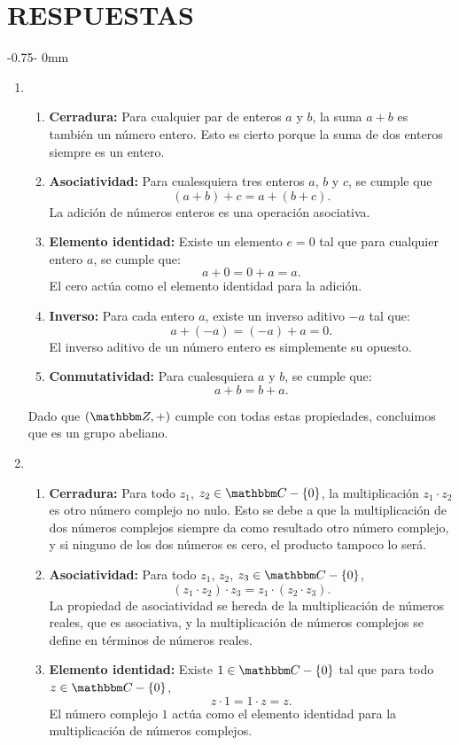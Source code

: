 \chapter{RESPUESTAS}

\noindent\begin{adjustwidth}{-0.75\marginparsep - \marginparwidth}{0mm}
\begin{multicols}{2}


\begin{enumerate}
    \item \begin{enumerate}
        \item \textbf{Cerradura:} Para cualquier par de enteros $a$ y $b$, la suma $a + b$ es también un número entero. Esto es cierto porque la suma de dos enteros siempre es un entero.
        \item \textbf{Asociatividad:} Para cualesquiera tres enteros $a$, $b$ y $c$, se cumple que
        $$(a + b) + c = a + (b + c).$$
        La adición de números enteros es una operación asociativa.
        \item \textbf{Elemento identidad:} Existe un elemento $e = 0$ tal que para cualquier entero $a$, se cumple que:
        $$a + 0 = 0 + a = a.$$
        El cero actúa como el elemento identidad para la adición.
        \item \textbf{Inverso:} Para cada entero $a$, existe un inverso aditivo $-a$ tal que:
        $$a + (-a) = (-a) + a = 0.$$
        El inverso aditivo de un número entero es simplemente su opuesto.
        \item \textbf{Conmutatividad:} Para cualesquiera $a$ y $b$, se cumple que:
        $$a + b = b + a.$$
    \end{enumerate}
    Dado que $(\ZZ, +)$ cumple con todas estas propiedades, concluimos que es un grupo abeliano.
    \item \begin{enumerate}
        \item \textbf{Cerradura:} Para todo $z_1$, $z_2 \in \CC - \{0\}$, la multiplicación $z_1 \cdot z_2$ es otro número complejo no nulo. Esto se debe a que la multiplicación de dos números complejos siempre da como resultado otro número complejo, y si ninguno de los dos números es cero, el producto tampoco lo será.
        \item \textbf{Asociatividad:} Para todo $z_1$, $z_2$, $z_3 \in \CC - \{0\}$,
        $$(z_1 \cdot z_2) \cdot z_3 = z_1 \cdot (z_2 \cdot z_3).$$
        La propiedad de asociatividad se hereda de la multiplicación de números reales, que es asociativa, y la multiplicación de números complejos se define en términos de números reales.
        \item \textbf{Elemento identidad:} Existe $1 \in \CC - \{0\}$ tal que para todo $z \in \CC - \{0\}$,
        $$z \cdot 1 = 1 \cdot z = z.$$
        El número complejo $1$ actúa como el elemento identidad para la multiplicación de números complejos.
    \end{enumerate}
\end{enumerate}


\end{multicols}
\end{adjustwidth}
